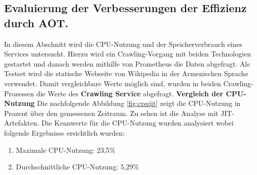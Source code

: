 \subsection{Evaluierung der Verbesserungen der Effizienz durch \acl{AOT}.} \label{sec:comparisonaot}
In diesem Abschnitt wird die CPU-Nutzung und der Speicherverbrauch eines Services untersucht.  Hierzu wird ein Crawling-Vorgang mit beiden Technologien gestartet und danach werden mithilfe von Prometheus die Daten abgefragt. Als Testset wird die statische Webseite von Wikipedia in der Armenischen Sprache verwendet. Damit vergleichbare Werte möglich sind, wurden in beiden Crawling-Prozessen die Werte des \textbf{Crawling Service} abgefragt.  \newline\newline
\textbf{Vergleich der CPU-Nutzung}\newline
Die nachfolgende Abbildung \ref{fig:cpujit} zeigt die CPU-Nutzung in Prozent über den gemessenen Zeitraum. Zu sehen ist die Analyse mit \ac{JIT}-Artefakten. Die Kennwerte für die CPU-Nutzung wurden analysiert wobei folgende Ergebnisse ersichtlich wurden:
\begin{enumerate}
    \item Maximale CPU-Nutzung: 23,5\%
    \item Durchschnittliche CPU-Nutzung: 5,29\%
\end{enumerate}

